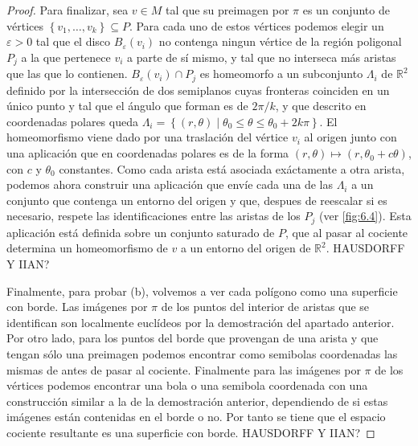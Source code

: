 \documentclass[10pt]{report}
\newcommand{\R}{\mathbb{R}}
\theoremstyle{definition}
\begin{document}
\begin{proof}
Para finalizar, sea $v\in M$ tal que su preimagen por $\pi$ es un conjunto de vértices $\left\{v_1,\dots ,v_k\right\} \subseteq P$. Para cada uno de estos vértices podemos elegir un $\varepsilon>0$ tal que el disco $B_{\varepsilon}(v_i)$ no contenga ningun vértice de la región poligonal $P_j$ a la que pertenece $v_i$ a parte de sí mismo, y tal que no interseca más aristas que las que lo contienen. $B_{\varepsilon}(v_i)\cap P_j$ es homeomorfo a un subconjunto $\Lambda_i$ de $\R^2$ definido por la intersección de dos semiplanos cuyas fronteras coinciden en un único punto y tal que el ángulo que forman es de $2\pi /k$, y que descrito en coordenadas polares queda $\Lambda_i =\left\{ (r,\theta ) \mid \theta_0 \leq \theta \leq \theta_0 + 2k\pi \right\}$. El homeomorfismo viene dado por una traslación del vértice $v_i$ al origen junto con una aplicación que en coordenadas polares es de la forma $(r,\theta ) \mapsto (r,\theta_0 +c\theta )$, con $c$ y $\theta_0$ constantes. Como cada arista está asociada exáctamente a otra arista, podemos ahora construir una aplicación que envíe cada una de las $\Lambda_i$ a un conjunto que contenga un entorno del origen y que, despues de reescalar si es necesario, respete las identificaciones entre las aristas de los $P_j$ (ver \autoref{fig:6.4}). Esta aplicación está definida sobre un conjunto saturado de $P$, que al pasar al cociente determina un homeomorfismo de $v$ a un entorno del origen de $\R^2$. HAUSDORFF Y IIAN?

Finalmente, para probar (b), volvemos a ver cada polígono como una superficie con borde. Las imágenes por $\pi$ de los puntos del interior de aristas que se identifican son localmente euclídeos por la demostración del apartado anterior. Por otro lado, para los puntos del borde que provengan de una arista y que tengan sólo una preimagen podemos encontrar como semibolas coordenadas las mismas de antes de pasar al cociente. Finalmente para las imágenes por $\pi$ de los vértices podemos encontrar una bola o una semibola coordenada con una construcción similar a la de la demostración anterior, dependiendo de si estas imágenes están contenidas en el borde o no. Por tanto se tiene que el espacio cociente resultante es una superficie con borde. HAUSDORFF Y IIAN?
\end{proof}
\end{document}

